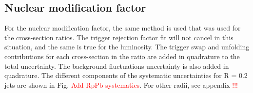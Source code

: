 \subsection{Nuclear modification factor}
\label{sec:systematicsRpA}

For the nuclear modification factor, the same method is used that was used for the cross-section ratios. The trigger rejection factor fit will not cancel in this situation, and the same is true for the luminosity. The trigger swap and unfolding contributions for each cross-section in the ratio are added in quadrature to the total uncertainty. The background fluctuations uncertainty is also added in quadrature. The different components of the systematic uncertainties for R = 0.2 jets are shown in Fig. \textcolor{red}{Add RpPb systematics}. For other radii, see appendix \textcolor{red}{!!!} %